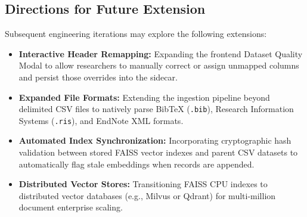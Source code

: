 \subsection{Directions for Future Extension}
Subsequent engineering iterations may explore the following extensions:
\begin{itemize}
    \item \textbf{Interactive Header Remapping:} Expanding the frontend Dataset Quality Modal to allow researchers to manually correct or assign unmapped columns and persist those overrides into the sidecar.
    \item \textbf{Expanded File Formats:} Extending the ingestion pipeline beyond delimited CSV files to natively parse BibTeX (\texttt{.bib}), Research Information Systems (\texttt{.ris}), and EndNote XML formats.
    \item \textbf{Automated Index Synchronization:} Incorporating cryptographic hash validation between stored FAISS vector indexes and parent CSV datasets to automatically flag stale embeddings when records are appended.
    \item \textbf{Distributed Vector Stores:} Transitioning FAISS CPU indexes to distributed vector databases (e.g., Milvus or Qdrant) for multi-million document enterprise scaling.
\end{itemize}
